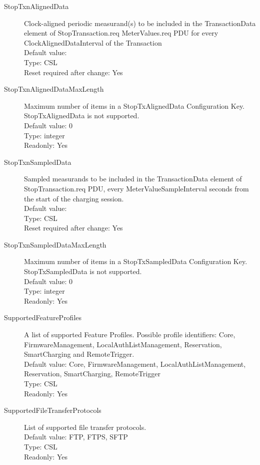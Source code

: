 \begin{description}
\item[StopTxnAlignedData] Clock-aligned periodic measurand(s) to be included in the TransactionData element of StopTransaction.req MeterValues.req PDU for every ClockAlignedDataInterval of the Transaction\\
  Default value: \\
  Type: CSL\\
  Reset required after change: Yes\\

\item[StopTxnAlignedDataMaxLength]  Maximum number of items in a StopTxAlignedData Configuration Key. StopTxAlignedData is not supported.\\
  Default value: 0\\
  Type: integer\\
  Readonly: Yes\\

\item[StopTxnSampledData] Sampled measurands to be included in the TransactionData element of StopTransaction.req PDU, every MeterValueSampleInterval seconds from the start of the charging session.\\
  Default value: \\
  Type: CSL\\
  Reset required after change: Yes\\

\item[StopTxnSampledDataMaxLength]  Maximum number of items in a StopTxSampledData Configuration Key. StopTxSampledData is not supported.\\
  Default value: 0\\
  Type: integer\\
  Readonly: Yes\\

\item[SupportedFeatureProfiles] A list of supported Feature Profiles. Possible profile identifiers: Core, FirmwareManagement, LocalAuthListManagement, Reservation, SmartCharging and RemoteTrigger.\\
  Default value: Core, FirmwareManagement, LocalAuthListManagement, Reservation, SmartCharging, RemoteTrigger\\
  Type: CSL\\
  Readonly: Yes\\

\item[SupportedFileTransferProtocols] List of supported file transfer protocols.\\
  Default value: FTP, FTPS, SFTP\\
  Type: CSL\\
  Readonly: Yes\\


\end{description}
